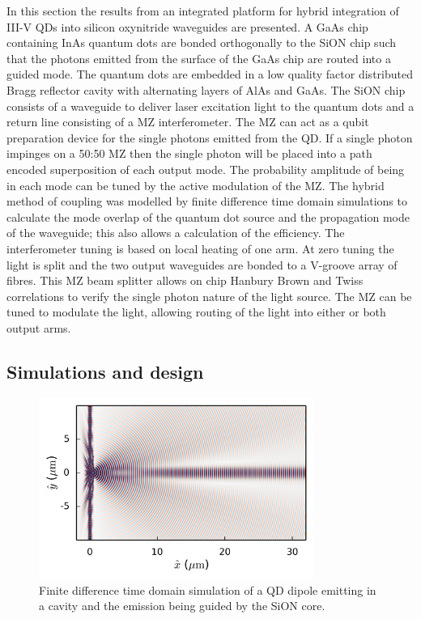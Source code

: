 In this section the results from an integrated platform for hybrid integration
of III-V QDs into silicon oxynitride waveguides are presented. A GaAs chip
containing InAs quantum dots are bonded orthogonally to the SiON chip such that
the photons emitted from the surface of the GaAs chip are routed into a guided
mode. The quantum dots are embedded in a low quality factor distributed Bragg
reflector cavity with alternating layers of AlAs and GaAs. The SiON chip
consists of a waveguide to deliver laser excitation light to the quantum dots
and a return line consisting of a MZ interferometer. The MZ can act as a qubit
preparation device for the single photons emitted from the QD. If a single
photon impinges on a 50:50 MZ then the single photon will be placed into a path
encoded superposition of each output mode. The probability amplitude of being in
each mode can be tuned by the active modulation of the MZ. The hybrid method of
coupling was modelled by finite difference time domain simulations to calculate
the mode overlap of the quantum dot source and the propagation mode of the
waveguide; this also allows a calculation of the efficiency. The interferometer
tuning is based on local heating of one arm. At zero tuning the light is split
and the two output waveguides are bonded to a V-groove array of fibres. This MZ
beam splitter allows on chip Hanbury Brown and Twiss correlations to verify the
single photon nature of the light source. The MZ can be tuned to modulate the
light, allowing routing of the light into either or both output arms.

\subsection{Simulations and design}

\begin{figure}[h!] \begin{center}
\includegraphics[width=0.8\textwidth]{images/sim.png} \caption{Finite difference
time domain simulation of a QD dipole emitting in a cavity and the emission
being guided by the SiON core.} \label{fig:sim} \end{center} \end{figure}

